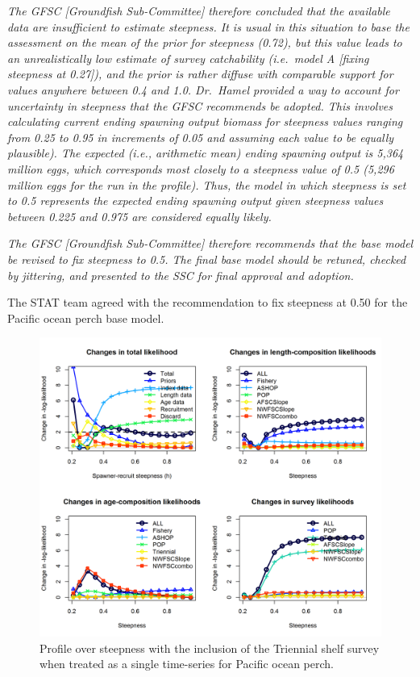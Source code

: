 \documentclass[12pt,]{article}
\begin{document}
\emph{The GFSC {[}Groundfish Sub-Committee{]} therefore concluded that
the available data are insufficient to estimate steepness. It is usual
in this situation to base the assessment on the mean of the prior for
steepness (0.72), but this value leads to an unrealistically low
estimate of survey catchability (i.e.~model A {[}fixing steepness at
0.27{]}), and the prior is rather diffuse with comparable support for
values anywhere between 0.4 and 1.0. Dr.~Hamel provided a way to account
for uncertainty in steepness that the GFSC recommends be adopted. This
involves calculating current ending spawning output biomass for
steepness values ranging from 0.25 to 0.95 in increments of 0.05 and
assuming each value to be equally plausible). The expected (i.e.,
arithmetic mean) ending spawning output is 5,364 million eggs, which
corresponds most closely to a steepness value of 0.5 (5,296 million eggs
for the run in the profile). Thus, the model in which steepness is set
to 0.5 represents the expected ending spawning output given steepness
values between 0.225 and 0.975 are considered equally likely.}

\emph{The GFSC {[}Groundfish Sub-Committee{]} therefore recommends that
the base model be revised to fix steepness to 0.5. The final base model
should be retuned, checked by jittering, and presented to the SSC for
final approval and adoption.}

The STAT team agreed with the recommendation to fix steepness at 0.50
for the Pacific ocean perch base model.

\begin{figure}
\centering
\includegraphics{Figures/triennial_piner_panel_h.png}
\caption{Profile over steepness with the inclusion of the Triennial
shelf survey when treated as a single time-series for Pacific ocean
perch. \label{fig:Tri_Profile}}
\end{figure}
\end{document}
